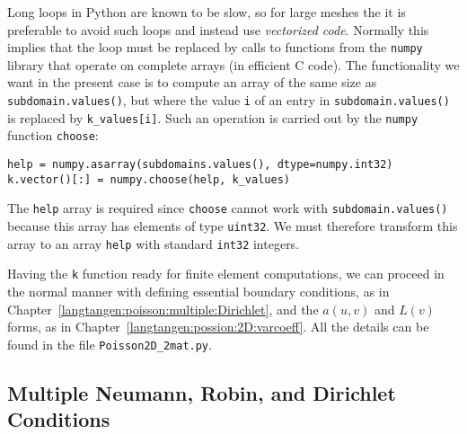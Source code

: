 Long loops in Python are known to be slow, so for large meshes the
it is preferable to avoid such loops and instead use \emph{vectorized code}.
Normally this implies that the loop must be replaced by
calls to functions from the {\fontsize{12pt}{12pt}\texttt{numpy}} library that operate on complete
arrays (in efficient C code). The functionality we want in the present
case is to compute an array of the same size as
{\fontsize{12pt}{12pt}\verb!subdomain.values()!}, but where the value {\fontsize{12pt}{12pt}\texttt{i}} of an entry
in {\fontsize{12pt}{12pt}\verb!subdomain.values()!} is replaced by {\fontsize{12pt}{12pt}\verb!k_values[i]!}.
Such an operation is carried out by the {\fontsize{12pt}{12pt}\texttt{numpy}} function {\fontsize{12pt}{12pt}\texttt{choose}}:
\begin{Verbatim}[fontsize=\fontsize{10pt}{10pt},tabsize=8,baselinestretch=1.05,
fontfamily=tt,xleftmargin=7mm]
help = numpy.asarray(subdomains.values(), dtype=numpy.int32)
k.vector()[:] = numpy.choose(help, k_values)
\end{Verbatim}
\noindent
The {\fontsize{12pt}{12pt}\texttt{help}} array is required since {\fontsize{12pt}{12pt}\texttt{choose}} cannot work with
{\fontsize{12pt}{12pt}\verb!subdomain.values()!} because this array has elements of
type {\fontsize{12pt}{12pt}\texttt{uint32}}. We must therefore transform this array to an array
{\fontsize{12pt}{12pt}\texttt{help}} with standard {\fontsize{12pt}{12pt}\texttt{int32}} integers.

Having the {\fontsize{12pt}{12pt}\texttt{k}} function ready for finite element computations, we
can proceed in the normal manner with defining essential boundary
conditions, as in Chapter~\ref{langtangen:poisson:multiple:Dirichlet},
and the $a(u,v)$ and $L(v)$ forms, as in
Chapter~\ref{langtangen:possion:2D:varcoeff}.
All the details can be found in the file {\fontsize{12pt}{12pt}\verb!Poisson2D_2mat.py!}.


\subsection{Multiple Neumann, Robin, and Dirichlet Conditions}
\label{langtangen:poisson:mat:neumann}

